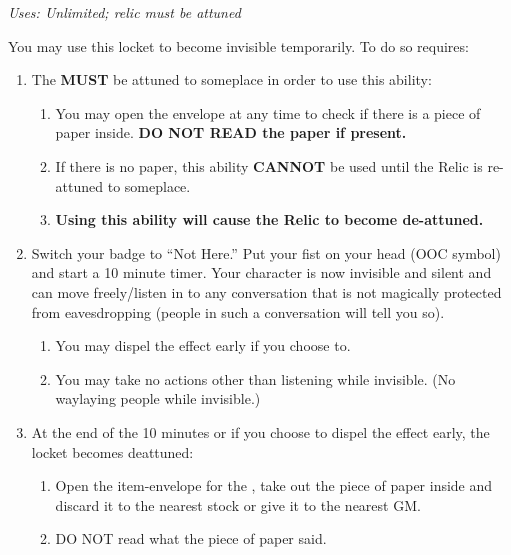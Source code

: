 \documentclass[green]{GL2020}
\begin{document}
\name{\gInvisible{}}

\emph{Uses: Unlimited; relic must be attuned} 

You may use this locket to become invisible temporarily. To do so requires:

\begin{enumerate}
	\item The \iLocket{} \textbf{MUST} be attuned to someplace in order to use this ability:
	\begin{enumerate}
		\item You may open the envelope at any time to check if there is a piece of paper inside. \textbf{DO NOT READ the paper if present.}
		\item  If there is no paper, this ability \textbf{CANNOT} be used until the Relic is re-attuned to someplace.
		\item \textbf{Using this ability will cause the Relic to become de-attuned.}
	\end{enumerate}
	\item Switch your badge to ``Not Here.'' Put your fist on your head (OOC symbol) and start a 10 minute timer. Your character is now invisible and silent and can move freely/listen in to any conversation that is not magically protected from eavesdropping (people in such a conversation will tell you so).
	\begin{enumerate}
		\item You may dispel the effect early if you choose to.
		\item You may take no actions other than listening while invisible. (No waylaying people while invisible.)
	\end{enumerate}
	\item At the end of the 10 minutes or if you choose to dispel the effect early, the locket becomes deattuned:
	\begin{enumerate}
		\item Open the item-envelope for the \iLocket{}, take out the piece of paper inside and discard it to the nearest stock or give it to the nearest GM.
		\item DO NOT read what the piece of paper said.
	\end{enumerate}
\end{enumerate}
\end{document}
